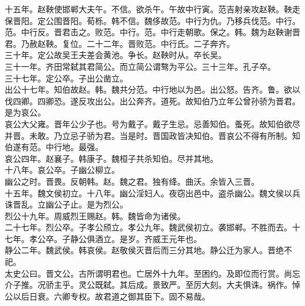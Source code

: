 \documentclass{zhvt-classic}
\begin{document}
\hspace*{2em}十五年。赵鞅使邯郸大夫午。不信。欲杀午。午故中行寅。范吉射亲攻赵鞅。鞅走保晋阳。定公围晋阳。荀栎。韩不信。魏侈故范。中行为仇。乃移兵伐范。中行。范。中行反。晋君击之。败范。中行。范。中行走朝歌。保之。韩。魏为赵鞅谢晋君。乃赦赵鞅。复位。二十二年。晋败范。中行氏。二子奔齐。\\
\hspace*{2em}三十年。定公故吴王夫差会黄池。争长。赵鞅时从。卒长吴。\\
\hspace*{2em}三十一年。齐田常弑其君简公。而立简公谓骜为平公。三十三年。孔子卒。\\
\hspace*{2em}三十七年。定公卒。子出公凿立。\\
\hspace*{2em}出公十七年。知伯故赵。韩。魏共分范。中行地以为邑。出公怒。告齐。鲁。欲以伐四卿。四卿恐。遂反攻出公。出公奔齐。道死。故知伯乃立年公曾孙骄为晋君。是为哀公。\\
\hspace*{2em}哀公大父雍。晋年公少子也。号为戴子。戴子生忌。忌善知伯。蚤死。故知伯欲尽并晋。未敢。乃立忌子骄为君。当是时。晋国政皆决知伯。晋哀公不得有所制。知伯遂有范。中行地。最强。\\
\hspace*{2em}哀公四年。赵襄子。韩康子。魏桓子共杀知伯。尽并其地。\\
\hspace*{2em}十八年。哀公卒。子幽公柳立。\\
\hspace*{2em}幽公之时。晋畏。反朝韩。赵。魏之君。独有绛。曲沃。余皆入三晋。\\
\hspace*{2em}十五年。魏文侯初立。十八年。幽公淫妇人。夜窃出邑中。盗杀幽公。魏文侯以兵诛晋乱。立幽公子止。是为烈公。\\
\hspace*{2em}烈公十九年。周威烈王赐赵。韩。魏皆命为诸侯。\\
\hspace*{2em}二十七年。烈公卒。子孝公颀立。孝公九年。魏武侯初立。袭邯郸。不胜而去。十七年。孝公卒。子静公俱酒立。是岁。齐威王元年也。\\
\hspace*{2em}静公二年。魏武侯。韩哀侯。赵敬侯灭晋后而三分其地。静公迁为家人。晋绝不祀。\\
\hspace*{2em}太史公曰。晋文公。古所谓明君也。亡居外十九年。至困约。及即位而行赏。尚忘介子推。况骄主乎。灵公既弑。其后成。景致严。至厉大刻。大夫惧诛。祸作。悼公以后日衰。六卿专权。故君道之御其臣下。固不易哉。\\
\end{document}
